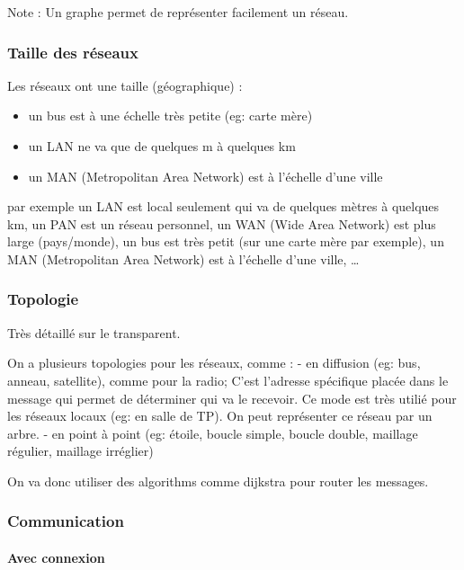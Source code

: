 Note : Un graphe permet de représenter facilement un réseau.

\hypertarget{taille-des-ruxe9seaux}{%
\subsubsection{Taille des réseaux}\label{taille-des-ruxe9seaux}}

Les réseaux ont une taille (géographique) :

\begin{itemize}
\tightlist
\item
  un bus est à une échelle très petite (eg: carte mère)
\item
  un LAN ne va que de quelques m à quelques km
\item
  un MAN (Metropolitan Area Network) est à l'échelle d'une ville
\end{itemize}

par exemple un LAN est local seulement qui va de quelques mètres à
quelques km, un PAN est un réseau personnel, un WAN (Wide Area Network)
est plus large (pays/monde), un bus est très petit (sur une carte mère
par exemple), un MAN (Metropolitan Area Network) est à l'échelle d'une
ville, \ldots{}

\hypertarget{topologie}{%
\subsubsection{Topologie}\label{topologie}}

Très détaillé sur le transparent.

On a plusieurs topologies pour les réseaux, comme : - en diffusion (eg:
bus, anneau, satellite), comme pour la radio; C'est l'adresse spécifique
placée dans le message qui permet de déterminer qui va le recevoir. Ce
mode est très utilié pour les réseaux locaux (eg: en salle de TP). On
peut représenter ce réseau par un arbre. - en point à point (eg: étoile,
boucle simple, boucle double, maillage régulier, maillage irréglier)

On va donc utiliser des algorithms comme dijkstra pour router les
messages.

\hypertarget{communication}{%
\subsubsection{Communication}\label{communication}}

\hypertarget{avec-connexion}{%
\paragraph{Avec connexion}\label{avec-connexion}}

